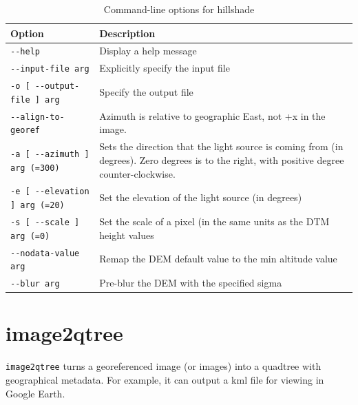 \begin{longtable}{|l|p{11cm}|}
\caption{Command-line options for hillshade}
\label{tbl:hillshade}
\endfirsthead
\endhead
\endfoot
\endlastfoot
\hline
Option & Description \\ \hline \hline
\verb#--help# & Display a help message\\ \hline
\verb#--input-file arg# & Explicitly specify the input file\\ \hline
\verb#-o [ --output-file ] arg# & Specify the output file\\ \hline
\verb#--align-to-georef# & Azimuth is relative to geographic East, not +x in the image.\\ \hline
\verb#-a [ --azimuth ] arg (=300)# & Sets the direction that the light source is coming from (in degrees).  Zero degrees is to the right, with positive degree counter-clockwise.\\ \hline
\verb#-e [ --elevation ] arg (=20)# & Set the elevation of the light source (in degrees)\\ \hline
\verb#-s [ --scale ] arg (=0)# & Set the scale of a pixel (in the same units as the DTM height values\\ \hline
\verb#--nodata-value arg# & Remap the DEM default value to the min altitude value\\ \hline
\verb#--blur arg# & Pre-blur the DEM with the specified sigma\\ \hline
\end{longtable}

\section{image2qtree}
\label{sec:image2qtree}

\verb#image2qtree# turns a georeferenced image (or images) into a quadtree with geographical metadata.  For example, it can output a kml file for viewing in Google Earth.



